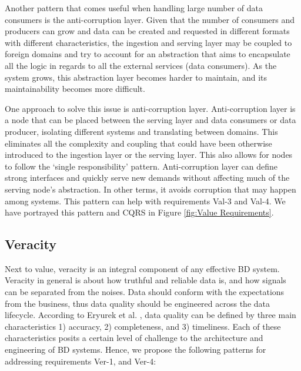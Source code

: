 \documentclass{bmcart}
\begin{document}
Another pattern that comes useful when handling large number of data consumers is the anti-corruption layer. Given that the number of consumers and producers can grow and data can be created and requested in different formats with different characteristics, the ingestion and serving layer may be coupled to foreign domains and try to account for an abstraction that aims to encapsulate all the logic in regards to all the external services (data consumers). As the system grows, this abstraction layer becomes harder to maintain, and its maintainability becomes more difficult. 

One approach to solve this issue is anti-corruption layer. Anti-corruption layer is a node that can be placed between the serving layer and data consumers or data producer, isolating different systems and translating between domains. This eliminates all the complexity and coupling that could have been otherwise introduced to the ingestion layer or the serving layer. This also allows for nodes to follow the `single responsibility' pattern. Anti-corruption layer can define strong interfaces and quickly serve new demands without affecting much of the serving node's abstraction. In other terms, it avoids corruption that may happen among systems. This pattern can help with requirements Val-3 and Val-4. We have portrayed this pattern and CQRS in Figure \ref{fig:Value Requirements}.




\subsection{Veracity}

Next to value, veracity is an integral component of any effective BD system. Veracity in general is about how truthful and reliable data is, and how signals can be separated from the noises. Data should conform with the expectations from the business, thus data quality should be engineered across the data lifecycle. According to Eryurek et al. \cite{eryurek2021data}, data quality can be defined by three main characteristics 1) accuracy, 2) completeness, and 3) timeliness. Each of these characteristics posits a certain level of challenge to the architecture and engineering of BD systems. Hence, we propose the following patterns for addressing requirements Ver-1, and Ver-4:
\end{document}
